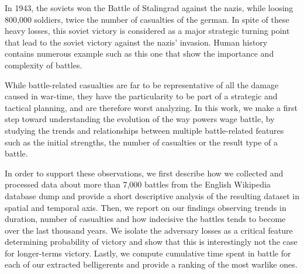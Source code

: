 In 1943, the soviets won the Battle of Stalingrad against the nazis, while loosing 800,000 soldiers, twice the number of casualties of the german. In spite of these heavy losses, this soviet victory is considered as a major strategic turning point that lead to the soviet victory against the nazis' invasion. Human history contains numerous example such as this one that show the importance and complexity of battles.

While battle-related casualties are far to be representative of all the damage caused in war-time, they have the particularity to be part of a strategic and tactical planning, and are therefore worst analyzing. In this work, we make a first step toward understanding the evolution of the way powers wage battle, by studying the trends and relationships between multiple battle-related features such as the initial strengths, the number of casualties or the result type of a battle. 

In order to support these observations, we first describe how we collected and processed data about more than 7,000 battles from the English Wikipedia database dump\cite{wikipedia_dump} and provide a short descriptive analysis of the resulting dataset in spatial and temporal axis. Then, we report on our findings observing trends in duration, number of casualties and how indecisive the battles tends to become over the last thousand years. We isolate the adversary losses as a critical feature determining probability of victory and show that this is interestingly not the case for longer-terms victory. Lastly, we compute cumulative time spent in battle for each of our extracted belligerents and provide a ranking of the most warlike ones.  


